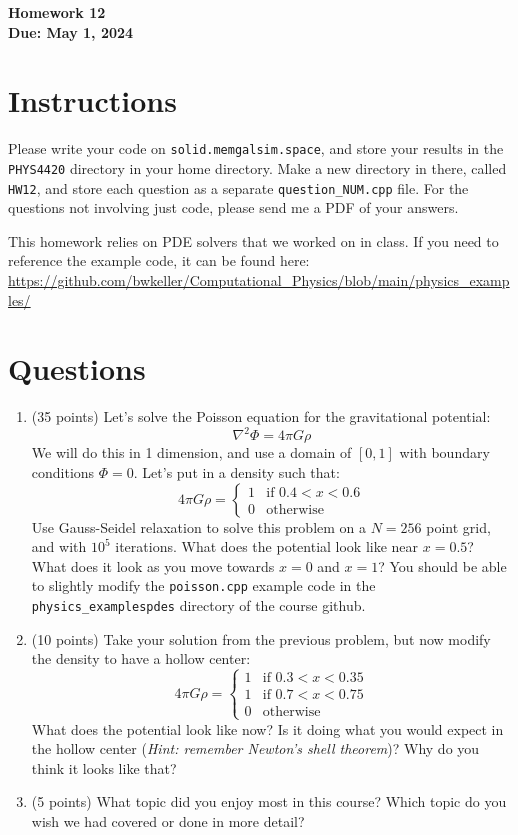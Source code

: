 \documentclass[11pt]{article}
\begin{document}
\begin{center}
\textbf{\Large Homework 12}\\
\textbf{Due: May 1, 2024}\\
\end{center}
\section*{Instructions}
Please write your code on \texttt{solid.memgalsim.space}, and store your results
in the \texttt{PHYS4420} directory in your home directory.  Make a new directory
in there, called \texttt{HW12}, and store each question as a separate
\texttt{question\_NUM.cpp} file.  For the questions not involving just code,
please send me a PDF of your answers.

This homework relies on PDE solvers that we worked on in class.  If you need to
reference the example code, it can be found here: \\
\url{https://github.com/bwkeller/Computational_Physics/blob/main/physics_examples/}

\section*{Questions}
\begin{enumerate}
    \item (35 points) Let's solve the Poisson equation for the gravitational
        potential:
        $$ \nabla^2 \Phi = 4\pi G \rho $$
        We will do this in 1 dimension, and use a domain of $[0,1]$ with
        boundary conditions $\Phi =0$.  Let's put in a density such that:
        $$ 4\pi G\rho =\begin{cases}
            1 & \text{if } 0.4 < x < 0.6 \\
            0 & \text{otherwise}
        \end{cases} $$ 
        Use Gauss-Seidel relaxation to solve this problem on a $N=256$ point grid, and with
        $10^5$ iterations.  What does the potential look like near $x=0.5$?  What
        does it look as you move towards $x=0$ and $x=1$?  You should be able to
        slightly modify the \texttt{poisson.cpp} example code in the
        \texttt{physics\_examples\/pdes} directory of the course github.
    \item (10 points) Take your solution from the previous problem, but now modify the
        density to have a hollow center:
        $$ 4\pi G\rho =\begin{cases}
            1 & \text{if } 0.3 < x < 0.35 \\
            1 & \text{if } 0.7 < x < 0.75 \\
            0 & \text{otherwise}
        \end{cases} $$ 
        What does the potential look like now?  Is it doing what you would
        expect in the hollow center (\textit{Hint: remember Newton's shell
        theorem})?  Why do you think it looks like that?
    \item (5 points) What topic did you enjoy most in this course?  Which topic
        do you wish we had covered or done in more detail?
\end{enumerate}
\end{document}

